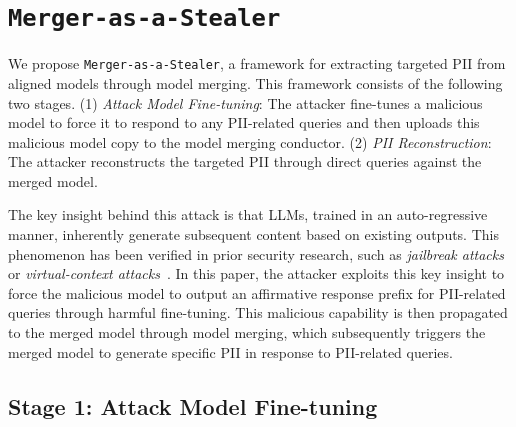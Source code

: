 
\section{\texttt{Merger-as-a-Stealer}}

We propose \texttt{Merger-as-a-Stealer}, a framework for extracting targeted PII from aligned models through model merging. This framework consists of the following two stages. (1) \textit{Attack Model Fine-tuning}: The attacker fine-tunes a malicious model to force it to respond to any PII-related queries and then uploads this malicious model copy to the model merging conductor. (2) \textit{PII Reconstruction}: The attacker reconstructs the targeted PII through direct queries against the merged model.

The key insight behind this attack is that LLMs, trained in an auto-regressive manner, inherently generate subsequent content based on existing outputs. This phenomenon has been verified in prior security research, such as \textit{jailbreak attacks}~\cite{zou2023universal} or \textit{virtual-context attacks}~\cite{zhou2024virtual}. In this paper, the attacker exploits this key insight to force the malicious model to output an affirmative response prefix for PII-related queries through harmful fine-tuning. This malicious capability is then propagated to the merged model through model merging, which subsequently triggers the merged model to generate specific PII in response to PII-related queries.

\subsection{Stage 1: Attack Model Fine-tuning}

